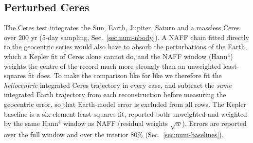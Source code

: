 \subsection{Perturbed Ceres}
\label{sec:res-ceres}

The Ceres test integrates the Sun, Earth, Jupiter, Saturn and a massless Ceres
over $200$ yr (5-day sampling, Sec.~\ref{sec:num-nbody}). A NAFF chain fitted
directly to the geocentric series would also have to absorb the
perturbations of the Earth, which a Kepler fit of Ceres alone cannot do, and the
NAFF window (Hann$^4$) weights the centre of the record much more strongly than
an unweighted least-squares fit does. To make the comparison like for like we
therefore fit the \emph{heliocentric} integrated Ceres trajectory in every case,
and subtract the \emph{same} integrated Earth trajectory from each reconstruction
before measuring the geocentric error, so that Earth-model error is excluded
from all rows. The Kepler baseline is a six-element least-squares fit, reported
both unweighted and weighted by the same Hann$^4$ window as NAFF (residual
weights $\sqrt w$). Errors are reported over the full window and over the interior
$80\%$ (Sec.~\ref{sec:num-baselines}).

